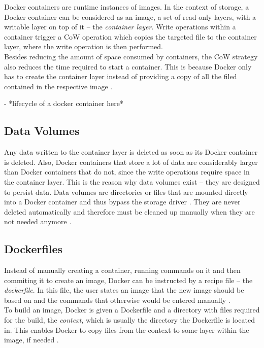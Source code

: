     Docker containers are runtime instances of images.
    In the context of storage, a Docker container can be considered as an image, \ie a set of read-only layers, with a writable layer on top of it -- the \emph{container layer}. Write operations within a container trigger a \ac{CoW} operation which copies the targeted file to the container layer, where the write operation is then performed. \\
    Besides reducing the amount of space consumed by containers, the \ac{CoW} strategy also reduces the time required to start a container. This is because Docker only has to create the container layer instead of providing a copy of all the filed contained in the respective image \cite{Docker????Dockera}.

    - *lifecycle of a docker container here*

  \subsection{Data Volumes} %
  \label{sub:data_volumes}
    Any data written to the container layer is deleted as soon as its Docker container is deleted.
    Also, Docker containers that store a lot of data are considerably larger than Docker containers that do not, since the write operations require space in the container layer. This is the reason why data volumes exist -- they are designed to persist data. Data volumes are directories or files that are mounted directly into a Docker container and thus bypass the storage driver \cite{Docker????Docker}. They are never deleted automatically and therefore must be cleaned up manually when they are not needed anymore \cite{Docker????Dockera}.


  \subsection{Dockerfiles} %
  \label{sub:dockerfiles}
    Instead of manually creating a container, running commands on it and then commiting it to create an image, Docker can be instructed by a recipe file -- the \emph{dockerfile}. In this file, the user states an image that the new image should be based on and the commands that otherwise would be entered manually \cite{Docker????Docker}. \\
    To build an image, Docker is given a Dockerfile and a directory with files required for the build, the \emph{context}, which is usually the directory the Dockerfile is located in. This enables Docker to copy files from the context to some layer within the image, if needed \cite{Docker????Docker}.

